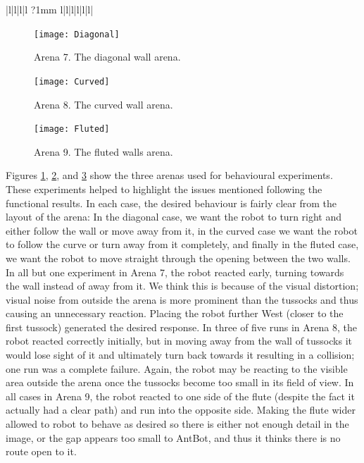 \documentclass[a4paper,11pt,twoside,openright]{article}
\begin{document}
\begin{center}
\begin{table}
\begin{tabular}{|l|l|l|l ?{1mm} l|l|l|l|l|l|}
   \end{tabular}
   \caption{The results for the behavioural experiments conducted on the optical flow system; for these, arenas were designed to
     elicit a certain behavioural response, however, they mostly failed to do so, highlighting problems with the current implementation
     and methods of experimentation. The ``As expected'' column denotes cases whether the robot performed the expected moves: No means
     not at all, Almost means that movements were initially correct then went wrong, and Yes means complete success.
    }
    \label{tab:ofrestwo}
  \end{table}
\end{center}

\begin{figure}
  \centering
  \texttt{[image: Diagonal]}
  \caption{
    \label{fig:diag} Arena 7. The diagonal wall arena.
  }
\end{figure}

\begin{figure}
  \centering
  \texttt{[image: Curved]}
  \caption{
    \label{fig:curved} Arena 8. The curved wall arena.
  }
\end{figure}

\begin{figure}
  \centering
  \texttt{[image: Fluted]}
  \caption{
    \label{fig:fluted} Arena 9. The fluted walls arena.
  }
\end{figure}

Figures \ref{fig:diag}, \ref{fig:curved}, and \ref{fig:fluted} show the three arenas used for behavioural experiments. These experiments
helped to highlight the issues mentioned following the functional results. In each case, the desired behaviour is fairly clear from the layout of
the arena: In the diagonal case, we want the robot to turn right and either follow the wall or move away from it, in the curved case we want the
robot to follow the curve or turn away from it completely, and finally in the fluted case, we want the robot to move straight through the
opening between the two walls. In all but one experiment in Arena 7, the robot reacted early, turning towards the wall instead of away from it. We
think this is because of the visual distortion; visual noise from outside the arena is more prominent than the tussocks and thus causing an unnecessary
reaction. Placing the robot further West (closer to the first tussock) generated the desired response. 
In three of five runs in Arena 8, the robot reacted correctly initially, but in moving away from the wall of tussocks it would lose sight of it and ultimately
turn back towards it resulting in a collision; one run was a complete failure. Again, the robot may be reacting to the visible area outside the arena once
the tussocks become too small in its field of view. In all cases in Arena 9, the robot reacted to one side of the
flute (despite the fact it actually
had a clear path) and run into the opposite side. Making the flute wider allowed to robot to behave as desired so there is either not enough detail in
the image, or the gap appears too small to AntBot, and thus it thinks there is no route open to it.
\newline
\end{document}
